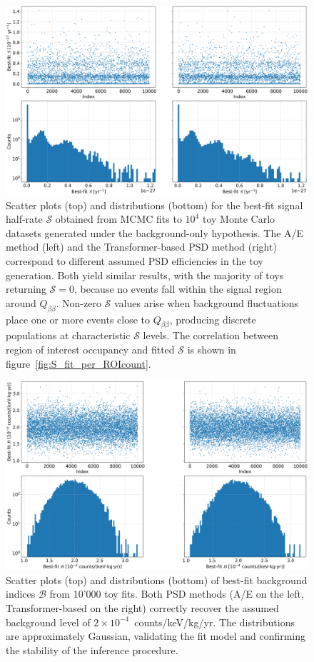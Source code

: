 \begin{figure}
\centering
\includegraphics[width=\linewidth]{figures/06_sensitivity/signal_fit_per_toy_1000kgyr.png}
\caption{Scatter plots (top) and distributions (bottom) for the best-fit signal half-rate $\mathcal{S}$ obtained from MCMC fits to $10^{4}$ toy Monte Carlo datasets generated under the background-only hypothesis. The A/E method (left) and the Transformer-based PSD method (right) correspond to different assumed PSD efficiencies in the toy generation. Both yield similar results, with the majority of toys returning $\mathcal{S} = 0$, because no events fall within the signal region around $Q_{\beta \beta}$. Non-zero $\mathcal{S}$ values arise when background fluctuations place one or more events close to $Q_{\beta \beta}$, producing discrete populations at characteristic $\mathcal{S}$ levels. The correlation between region of interest occupancy and fitted $\mathcal{S}$ is shown in figure~\ref{fig:S_fit_per_ROIcount}.}
\label{fig:S_fit_per_toy}
\end{figure}


\begin{figure}[t]
\centering
\includegraphics[width=\linewidth]{figures/06_sensitivity/bkg_fit_per_toy_1000kgyr.png}
\caption{Scatter plots (top) and distributions (bottom) of best-fit background indices $\mathcal{B}$ from 10'000 toy fits. Both PSD methods (A/E on the left, Transformer-based on the right) correctly recover the assumed background level of $2 \times 10^{-4}$~counts/keV/kg/yr. The distributions are approximately Gaussian, validating the fit model and confirming the stability of the inference procedure.} 
\label{fig:B_fit_per_toy}
\end{figure}


